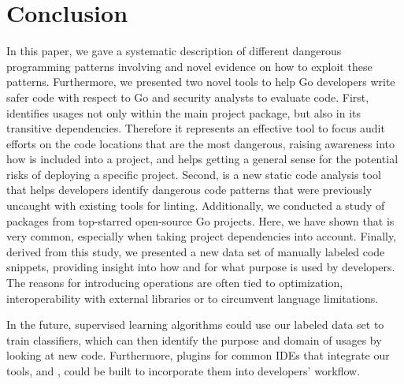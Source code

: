 \section{Conclusion}
\label{sec:concl}

In this paper, we gave a systematic description of different dangerous programming patterns involving \unsafe{} and novel evidence on how to exploit these patterns. %
Furthermore, we presented two novel tools to help Go developers write safer code with respect to \unsafe{} Go and security analysts to evaluate \unsafe{} code.
First, \toolUsage{} identifies \unsafe{} usages not only within the main project package, but also in its transitive dependencies. 
Therefore it represents an effective tool to focus audit efforts on the code locations that are the most dangerous, raising awareness into how \unsafe{} is included into a project, and helps getting a general sense for the potential risks of deploying a specific project.
Second, \toolSA{} is a new static code analysis tool that helps developers identify dangerous code patterns that were previously uncaught with existing tools for linting.
Additionally, we conducted a study of \packagesAnalyzed{} packages from \projsAnalyzed{} top-starred open-source Go projects.
Here, we have shown that \unsafe{} is very common, especially when taking project dependencies into account. 
Finally, derived from this study, we presented a new data set of manually labeled code snippets, providing insight into how and for what purpose \unsafe{} is used by developers.
The reasons for introducing \unsafe{} operations are often tied to optimization, interoperability with external libraries or to circumvent language limitations.

In the future, supervised learning algorithms could use our labeled data set to train classifiers, which can then identify the purpose and domain of \unsafe{} usages by looking at new code. 
Furthermore, plugins for common IDEs that integrate our tools, \toolUsage{} and \toolSA{}, could be built to incorporate them into developers' workflow.%
